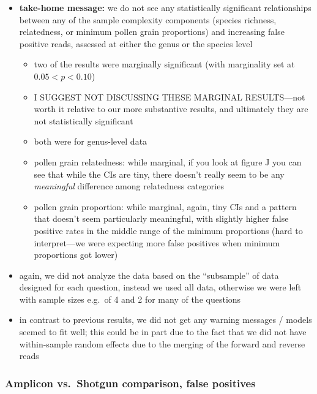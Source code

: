 \documentclass[
]{article}
\providecommand{\tightlist}{%
  \setlength{\itemsep}{0pt}\setlength{\parskip}{0pt}}
\begin{document}
\begin{itemize}
\tightlist
\item
  \textbf{take-home message:} we do not see any statistically
  significant relationships between any of the sample complexity
  components (species richness, relatedness, or minimum pollen grain
  proportions) and increasing false positive reads, assessed at either
  the genus or the species level

  \begin{itemize}
  \tightlist
  \item
    two of the results were marginally significant (with marginality set
    at \(0.05 < p < 0.10\))
  \item
    I SUGGEST NOT DISCUSSING THESE MARGINAL RESULTS---not worth it
    relative to our more substantive results, and ultimately they are
    not statistically significant
  \item
    both were for genus-level data
  \item
    pollen grain relatedness: while marginal, if you look at figure J
    you can see that while the CIs are tiny, there doesn't really seem
    to be any \emph{meaningful} difference among relatedness categories
  \item
    pollen grain proportion: while marginal, again, tiny CIs and a
    pattern that doesn't seem particularly meaningful, with slightly
    higher false positive rates in the middle range of the minimum
    proportions (hard to interpret---we were expecting more false
    positives when minimum proportions got lower)
  \end{itemize}
\item
  again, we did not analyze the data based on the ``subsample'' of data
  designed for each question, instead we used all data, otherwise we
  were left with sample sizes e.g.~of 4 and 2 for many of the questions
\item
  in contrast to previous results, we did not get any warning messages /
  models seemed to fit well; this could be in part due to the fact that
  we did not have within-sample random effects due to the merging of the
  forward and reverse reads
\end{itemize}

\hypertarget{amplicon-vs.-shotgun-comparison-false-positives}{%
\subsubsection{Amplicon vs.~Shotgun comparison, false
positives}\label{amplicon-vs.-shotgun-comparison-false-positives}}
\end{document}
